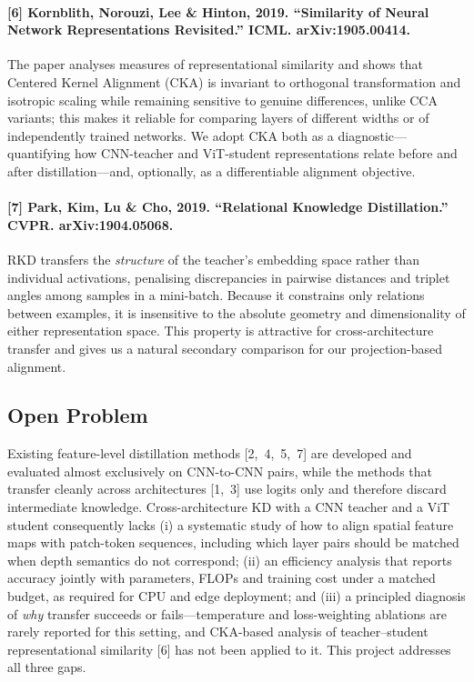 \documentclass[11pt, letterpaper]{article}
\begin{document}
\paragraph{[6] Kornblith, Norouzi, Lee \& Hinton, 2019. ``Similarity of Neural Network Representations Revisited.'' ICML. arXiv:1905.00414.}
The paper analyses measures of representational similarity and shows that
Centered Kernel Alignment (CKA) is invariant to orthogonal transformation and
isotropic scaling while remaining sensitive to genuine differences, unlike CCA
variants; this makes it reliable for comparing layers of different widths or of
independently trained networks. We adopt CKA both as a diagnostic---quantifying
how CNN-teacher and ViT-student representations relate before and after
distillation---and, optionally, as a differentiable alignment objective.

\paragraph{[7] Park, Kim, Lu \& Cho, 2019. ``Relational Knowledge Distillation.'' CVPR. arXiv:1904.05068.}
RKD transfers the \emph{structure} of the teacher's embedding space rather than
individual activations, penalising discrepancies in pairwise distances and
triplet angles among samples in a mini-batch. Because it constrains only
relations between examples, it is insensitive to the absolute geometry and
dimensionality of either representation space. This property is attractive for
cross-architecture transfer and gives us a natural secondary comparison for our
projection-based alignment.

\subsection{Open Problem}

Existing feature-level distillation methods [2,~4,~5,~7] are developed and
evaluated almost exclusively on CNN-to-CNN pairs, while the methods that
transfer cleanly across architectures [1,~3] use logits only and therefore
discard intermediate knowledge. Cross-architecture KD with a CNN teacher and a
ViT student consequently lacks (i) a systematic study of how to align spatial
feature maps with patch-token sequences, including which layer pairs should be
matched when depth semantics do not correspond; (ii) an efficiency analysis that
reports accuracy jointly with parameters, FLOPs and training cost under a
matched budget, as required for CPU and edge deployment; and (iii) a principled
diagnosis of \emph{why} transfer succeeds or fails---temperature and
loss-weighting ablations are rarely reported for this setting, and CKA-based
analysis of teacher--student representational similarity [6] has not been applied
to it. This project addresses all three gaps.
\end{document}
